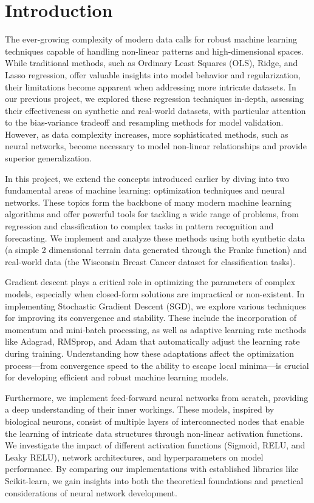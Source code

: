 \documentclass[aps,pra,english,notitlepage,reprint,nofootinbib]{revtex4-1}  %
\begin{document}

\section{Introduction}\label{sec:introduction}

The ever-growing complexity of modern data calls for robust machine learning techniques capable of handling non-linear patterns and high-dimensional spaces. While traditional methods, such as Ordinary Least Squares (OLS), Ridge, and Lasso regression, offer valuable insights into model behavior and regularization, their limitations become apparent when addressing more intricate datasets. In our previous project, we explored these regression techniques in-depth, assessing their effectiveness on synthetic and real-world datasets, with particular attention to the bias-variance tradeoff and resampling methods for model validation. However, as data complexity increases, more sophisticated methods, such as neural networks, become necessary to model non-linear relationships and provide superior generalization.

In this project, we extend the concepts introduced earlier by diving into two fundamental areas of machine learning: optimization techniques and neural networks. These topics form the backbone of many modern machine learning algorithms and offer powerful tools for tackling a wide range of problems, from regression and classification to complex tasks in pattern recognition and forecasting. We implement and analyze these methods using both synthetic data (a simple 2 dimensional terrain data generated through the Franke function) and real-world data (the Wisconsin Breast Cancer dataset for classification tasks).

Gradient descent plays a critical role in optimizing the parameters of complex models, especially when closed-form solutions are impractical or non-existent. In implementing Stochastic Gradient Descent (SGD), we explore various techniques for improving its convergence and stability. These include the incorporation of momentum and mini-batch processing, as well as adaptive learning rate methods like Adagrad, RMSprop, and Adam that automatically adjust the learning rate during training. Understanding how these adaptations affect the optimization process—from convergence speed to the ability to escape local minima—is crucial for developing efficient and robust machine learning models.

Furthermore, we implement feed-forward neural networks from scratch, providing a deep understanding of their inner workings. These models, inspired by biological neurons, consist of multiple layers of interconnected nodes that enable the learning of intricate data structures through non-linear activation functions. We investigate the impact of different activation functions (Sigmoid, RELU, and Leaky RELU), network architectures, and hyperparameters on model performance. By comparing our implementations with established libraries like Scikit-learn, we gain insights into both the theoretical foundations and practical considerations of neural network development.
\end{document}
